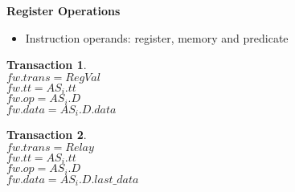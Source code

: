 \documentclass[12pt]{slides}
\newtheorem{trans}{Transaction}
\begin{document}
\begin{slide}
\begin{center}
\textbf {Register Operations}
\end{center}
%
\begin{itemize}
%
\item 
Instruction operands: register, memory and predicate 
%
\end{itemize}

\begin{trans}
\mbox{} \\
\indent $fw.trans = RegVal $ \\
\indent $fw.tt = AS_i.tt$ \\
\indent $fw.op = AS_i.D $ \\
\indent $fw.data = AS_i.D.data $
\end{trans}


\begin{trans}
\mbox{} \\
\indent $fw.trans = Relay$ \\
\indent $fw.tt = AS_i.tt$ \\
\indent $fw.op = AS_i.D $ \\
\indent $fw.data = AS_i.D.last\_data $
\end{trans}

\end{slide}
\end{document}
